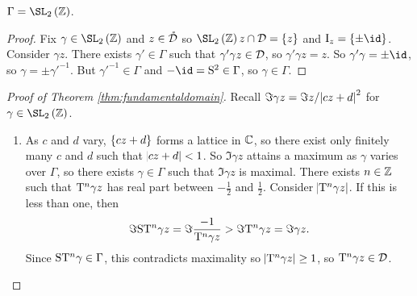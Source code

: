 \begin{corollary}
$ \Gamma = \SL_2\br{\ZZ} $.
\end{corollary}

\begin{proof}
Fix $ \gamma \in \SL_2\br{\ZZ} $ and $ z \in \mathring{\mathcal{D}} $ so $ \SL_2\br{\ZZ}z \cap \DDD = \cbr{z} $ and $ \I_z = \cbr{\pm\id} $. Consider $ \gamma z $. There exists $ \gamma' \in \Gamma $ such that $ \gamma'\gamma z \in \mathcal{D} $, so $ \gamma'\gamma z = z $. So $ \gamma'\gamma = \pm\id $, so $ \gamma = \pm\gamma'^{-1} $. But $ \gamma'^{-1} \in \Gamma $ and $ -\id = \S^2 \in \Gamma $, so $ \gamma \in \Gamma $.
\end{proof}

\pagebreak

\begin{proof}[Proof of Theorem \ref{thm:fundamentaldomain}]
Recall $ \Im \gamma z = \Im z / \abs{cz + d}^2 $ for $ \gamma \in \SL_2\br{\ZZ} $.
\begin{enumerate}
\item As $ c $ and $ d $ vary, $ \cbr{cz + d} $ forms a lattice in $ \mathbb{C} $, so there exist only finitely many $ c $ and $ d $ such that $ \abs{cz + d} < 1 $. So $ \Im \gamma z $ attains a maximum as $ \gamma $ varies over $ \Gamma $, so there exists $ \gamma \in \Gamma $ such that $ \Im \gamma z $ is maximal. There exists $ n \in \mathbb{Z} $ such that $ \mathrm{T}^n\gamma z $ has real part between $ -\tfrac{1}{2} $ and $ \tfrac{1}{2} $. Consider $ \abs{\mathrm{T}^n\gamma z} $. If this is less than one, then
$$ \Im \mathrm{S}\mathrm{T}^n\gamma z = \Im \dfrac{-1}{\mathrm{T}^n\gamma z} > \Im \mathrm{T}^n\gamma z = \Im \gamma z. $$
Since $ \mathrm{S}\mathrm{T}^n\gamma \in \Gamma $, this contradicts maximality so $ \abs{\mathrm{T}^n\gamma z} \ge 1 $, so $ \mathrm{T}^n\gamma z \in \mathcal{D} $.



\end{enumerate}
\end{proof}
